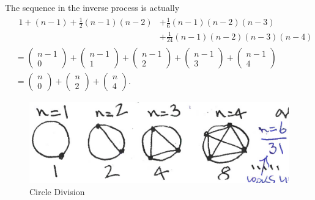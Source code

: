 \documentclass[12pt]{report}
\theoremstyle{definition}
\begin{document}
The sequence in the inverse process is actually\[
    \begin{align*} 
        & \begin{aligned}
        1 + (n - 1) + \frac{1}{2}(n-1)(n-2) & + \frac{1}{6}(n-1)(n-2)(n-3) \\
                                            & + \frac{1}{24}(n-1)(n-2)(n-3)(n-4) 
        \end{aligned} \\
                    & = \begin{pmatrix}
                            n-1 \\
                            0
                    \end{pmatrix} + \begin{pmatrix}
                            n-1 \\
                            1
                    \end{pmatrix} + \begin{pmatrix}
                            n-1 \\
                            2
                    \end{pmatrix} + \begin{pmatrix}
                            n-1 \\
                            3
                    \end{pmatrix} + \begin{pmatrix}
                            n-1 \\
                            4
                    \end{pmatrix} \\
                    & = \begin{pmatrix}
                            n \\
                            0
                    \end{pmatrix} + \begin{pmatrix}
                            n \\
                            2
                    \end{pmatrix} + \begin{pmatrix}
                            n \\
                            4
                    \end{pmatrix}.
    \end{align*}
\]
\begin{figure}
  \includegraphics[scale=0.15]{circlePartition.jpeg}
  \centering
  \caption{Circle Division}\label{fig:circDiv}
\end{figure}
\end{document}
